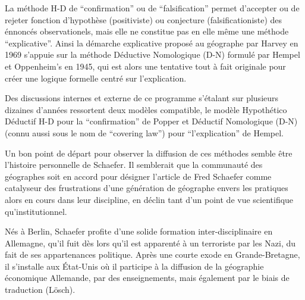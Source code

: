La méthode H-D de \enquote{confirmation} ou de \enquote{falsification} permet d'accepter ou de rejeter fonction d'hypothèse (positiviste) ou conjecture (falsificationiste) des énnoncés observationels, mais elle ne constitue pas en elle même une méthode \enquote{explicative}. Ainsi la démarche explicative proposé au géographe par Harvey en 1969 s'appuie sur la méthode Déductive Nomologique (D-N) formulé par Hempel et Oppenheim’s en 1945, qui est alors une tentative tout à fait originale pour créer une logique formelle centré sur l'explication.

Des discussions internes et externe de ce programme s'étalant sur plusieurs dizaines d'années ressortent deux modèles compatible, le modèle Hypothético Déductif H-D pour la \enquote{confirmation} de Popper et Déductif Nomologique (D-N) (connu aussi sous le nom de \foreignquote{english}{covering law}) pour \enquote{l'explication} de Hempel.

Un bon point de départ pour observer la diffusion de ces méthodes semble être l'histoire personnelle de Schaefer. Il semblerait que la communauté des géographes soit en accord \autocite[15]{Louail2010} pour désigner l'article de Fred Schaefer \autocite{Schaefer1953} comme catalyseur des frustrations d'une génération de géographe envers les pratiques alors en cours dans leur discipline, en déclin tant d'un point de vue scientifique qu’institutionnel.

Nés à Berlin, Schaefer profite d'une solide formation inter-disciplinaire en Allemagne, qu'il fuit dès lors qu'il est apparenté à un terroriste par les Nazi, du fait de ses appartenances politique. Après une courte exode en Grande-Bretagne, il s'installe aux État-Unis où il participe à la diffusion de la géographie économique Allemande, par des enseignements, mais également par le biais de traduction (Lösch). \autocite{Bunge1979}

